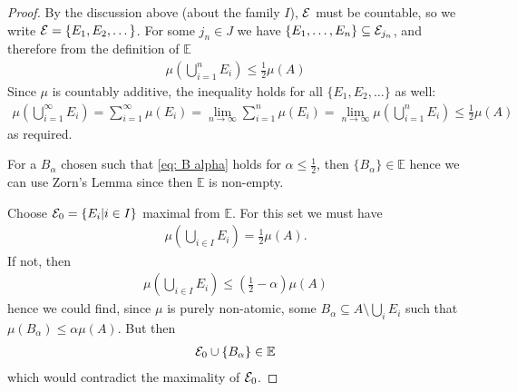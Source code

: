 \documentclass[../../main.tex]{subfiles}
\begin{document}
\begin{proof}
By the discussion above (about the family $I$), $\mathcal{E}$ must be countable, so we write $\mathcal{E}=\{E_{1}, E_{2}, \dots\}$. For some $j_{n}\in J$ we have $\{E_{1}, \dots, E_{n}\}\subseteq \mathcal{E}_{j_{n}}$, and therefore from the definition of $\mathbb{E}$
\begin{align*}
	\mu\left( \bigcup_{i=1}^{n}E_{i} \right) \le \frac{1}{2}\mu(A)
\end{align*}
Since $\mu$ is countably additive, the inequality holds for all $\{E_{1}, E_{2}, \dots\}$ as well:
\begin{align*}
	\mu\left( \bigcup_{i=1}^{\infty}E_{i} \right) = \sum_{i=1}^{\infty}\mu(E_{i}) = \lim_{n\to \infty}\sum_{i=1}^{n}\mu(E_{i})=\lim_{n\to \infty} \mu\left( \bigcup_{i=1}^{n} E_{i} \right) \le \frac{1}{2} \mu(A)
\end{align*}
as required.

For a $B_{\alpha}$ chosen such that \eqref{eq: B alpha} holds for $\alpha \le \frac{1}{2}$, then $\{B_{\alpha}\}\in \mathbb{E}$ hence we can use Zorn's Lemma since then $\mathbb{E}$ is non-empty.

Choose $\mathcal{E}_{0}=\{E_{i} | i\in I\}$ maximal from $\mathbb{E}$. For this set we must have
\begin{align*}
	\mu\left( \bigcup_{i\in I} E_{i} \right)=\frac{1}{2}\mu(A).
\end{align*}
If not, then
\begin{align*}
	\mu\left( \bigcup_{i\in I}E_{i} \right) \le \left( \frac{1}{2} - \alpha \right) \mu(A)
\end{align*}
hence we could find, since $\mu$ is purely non-atomic, some $B_{\alpha}\subseteq A\setminus \bigcup_{i}E_{i}$ such that $\mu(B_{\alpha})\le \alpha \mu(A)$. But then
\begin{align*}
	\mathcal{E}_{0}\cup \{B_{\alpha}\} \in \mathbb{E}
\end{align*}
which would contradict the maximality of $\mathcal{E}_{0}$.
\end{proof}
\end{document}
